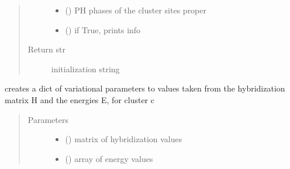 \documentclass[letterpaper,10pt,english]{sphinxmanual}
\begin{document}
\begin{fulllineitems}
\begin{fulllineitems}
\begin{quote}
\begin{description}
\begin{itemize}
\item {} 
\sphinxAtStartPar
{} (\sphinxstyleliteralemphasis{\sphinxupquote{{[}}}\sphinxstyleliteralemphasis{\sphinxupquote{{]}}}) \textendash{} PH phases of the cluster sites proper

\item {} 
\sphinxAtStartPar
{} () \textendash{} if True, prints info

\end{itemize}

\item[{Return str}] \leavevmode
\sphinxAtStartPar
initialization string

\end{description}\end{quote}

\end{fulllineitems}


\begin{fulllineitems}
\label{\detokenize{cdmft:pyqcm.cdmft.general_bath.varia}}
\sphinxAtStartPar
creates a dict of variational parameters to values taken from the hybridization matrix H and the energies E, for cluster c
\begin{quote}\begin{description}
\item[{Parameters}] \leavevmode\begin{itemize}
\item {} 
\sphinxAtStartPar
{} () \textendash{} matrix of hybridization values

\item {} 
\sphinxAtStartPar
{} () \textendash{} array of energy values


\end{itemize}
\end{description}
\end{quote}
\end{fulllineitems}
\end{fulllineitems}
\end{document}
